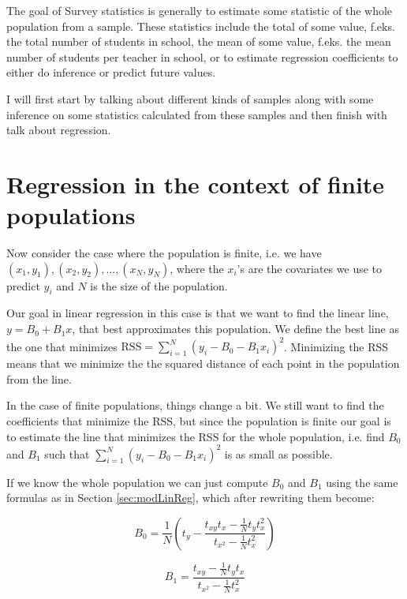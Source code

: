\documentclass{article}
\begin{document}
The goal of Survey statistics is generally to estimate some statistic of the whole
population from a sample. These statistics include the total of some value,
f.eks. the total number of students in school, the mean of some value, f.eks.
the mean number of students per teacher in school, or to estimate regression
coefficients to either do inference or predict future values.

I will first start by talking about different kinds of samples along with some
inference on some statistics calculated from these samples and then finish with
talk about regression.


\section{Regression in the context of finite populations}
Now consider the case where the population is finite, i.e. we have \((x_1, y_1),
(x_2, y_2), \dots , (x_N, y_N)\), where the \(x_i\)'s are the covariates we use to
predict \(y_i\) and \(N\) is the size of the population.

Our goal in linear regression in this case is that we want to find the linear
line, \(y = B_0 + B_1x\), that best approximates this population. We define the best line as the one
that minimizes \(\mathrm{RSS} = \sum_{i = 1}^N (y_i - B_0 - B_1 x_i)^2\).
Minimizing the RSS means that we minimize the the squared distance of each point
in the population from the line.

In the case of finite populations, things change a bit. We still want to find the
coefficients that minimize the RSS, but since the population is finite our goal
is to estimate the line that minimizes the RSS for the whole population, i.e. find
\(B_0\) and \(B_1\) such that \(\sum_{i = 1}^N (y_i - B_0 - B_1 x_i)^2\) is as small as
possible.

If we know the whole population we can just compute \(B_0\) and \(B_1\) using the same formulas
as in Section \ref{sec:modLinReg}, which after rewriting them become:

\begin{equation*}
  B_0 = \frac{1}{N} \left( t_y - \frac{t_{xy} t_x - \frac{1}{N} t_y t_x^2}
    {t_{x^2} - \frac{1}{N} t_x^2}
   \right)
\end{equation*}

\begin{equation*}
  B_1 = \frac{t_{xy} - \frac{1}{N} t_y t_x}
    {t_{x^2} - \frac{1}{N} t_x^2}
\end{equation*}
\end{document}
